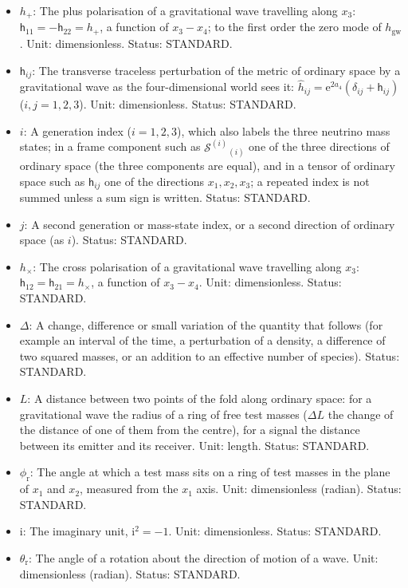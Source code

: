 \documentclass[
  10pt,
]{article}
\begin{document}
\begin{itemize}
  and \(-1\) for a negative one. Status: STANDARD.
\item
  \(h_{+}\): The plus polarisation of a gravitational wave travelling
  along \(x_3\): \(\mathsf{h}_{11} = -\mathsf{h}_{22} = h_{+}\), a
  function of \(x_3 - x_4\); to the first order the zero mode of
  \(h_{\mathrm{gw}}\). Unit: dimensionless. Status: STANDARD.
\item
  \(\mathsf{h}_{ij}\): The transverse traceless perturbation of the
  metric of ordinary space by a gravitational wave as the
  four-dimensional world sees it:
  \(\hat h_{ij} = \mathrm{e}^{2a_4}(\delta_{ij} + \mathsf{h}_{ij})\)
  (\(i, j = 1, 2, 3\)). Unit: dimensionless. Status: STANDARD.
\item
  \(i\): A generation index (\(i = 1, 2, 3\)), which also labels the
  three neutrino mass states; in a frame component such as
  \(\mathcal{S}^{(i)}{}_{(i)}\) one of the three directions of ordinary
  space (the three components are equal), and in a tensor of ordinary
  space such as \(\mathsf{h}_{ij}\) one of the directions
  \(x_1, x_2, x_3\); a repeated index is not summed unless a sum sign is
  written. Status: STANDARD.
\item
  \(j\): A second generation or mass-state index, or a second direction
  of ordinary space (as \(i\)). Status: STANDARD.
\item
  \(h_{\times}\): The cross polarisation of a gravitational wave
  travelling along \(x_3\):
  \(\mathsf{h}_{12} = \mathsf{h}_{21} = h_{\times}\), a function of
  \(x_3 - x_4\). Unit: dimensionless. Status: STANDARD.
\item
  \(\Delta\): A change, difference or small variation of the quantity
  that follows (for example an interval of the time, a perturbation of a
  density, a difference of two squared masses, or an addition to an
  effective number of species). Status: STANDARD.
\item
  \(L\): A distance between two points of the fold along ordinary space:
  for a gravitational wave the radius of a ring of free test masses
  (\(\Delta L\) the change of the distance of one of them from the
  centre), for a signal the distance between its emitter and its
  receiver. Unit: length. Status: STANDARD.
\item
  \(\phi_{\mathrm{r}}\): The angle at which a test mass sits on a ring
  of test masses in the plane of \(x_1\) and \(x_2\), measured from the
  \(x_1\) axis. Unit: dimensionless (radian). Status: STANDARD.
\item
  \(\mathrm{i}\): The imaginary unit, \(\mathrm{i}^2 = -1\). Unit:
  dimensionless. Status: STANDARD.
\item
  \(\theta_{\mathrm{r}}\): The angle of a rotation about the direction
  of motion of a wave. Unit: dimensionless (radian). Status: STANDARD.
\end{itemize}
\end{document}
